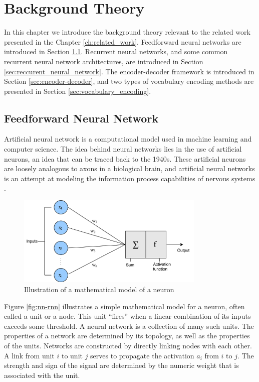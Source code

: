 
\chapter{Background Theory}
\label{ch:background}
In this chapter we introduce the background theory relevant to the related work presented in the Chapter \ref{ch:related_work}. Feedforward neural networks are introduced in Section \ref{sec:feedforward_neural_network}. Recurrent neural networks, and some common recurrent neural network architectures, are introduced in Section \ref{sec:reccurent_neural_network}. The encoder-decoder framework is introduced in Section \ref{sec:encoder-decoder}, and two types of vocabulary encoding methods are presented in Section \ref{sec:vocabulary_encoding}.


\section{Feedforward Neural Network}
\label{sec:feedforward_neural_network}
Artificial neural network is a computational model used in machine learning and computer science. The idea behind neural networks lies in the use of artificial neurons, an idea that can be traced back to the 1940s. These artificial neurons are loosely analogous to axons in a biological brain, and artificial neural networks is an attempt at modeling the information process capabilities of nervous systems \citep{russell2010aimodernapproach}.

\begin{figure}[h]
    \centering
    \includegraphics[width=0.8\textwidth]{fig/related_work/perceptron.png}
    \caption{Illustration of a mathematical model of a neuron}
    \label{fig:nn-perceptron}
\end{figure}

Figure \ref{fig:nn-rnn} illustrates a simple mathematical model for a neuron, often called a unit or a node. This unit ``fires'' when a linear combination of its inputs exceeds some threshold. A neural network is a collection of many such units. The properties of a network are determined by its topology, as well as the properties of the units. Networks are constructed by directly linking nodes with each other. A link from unit \(i\) to unit \(j\) serves to propagate the activation \(a_{i}\) from \(i\) to \(j\). The strength and sign of the signal are determined by the numeric weight that is associated with the unit. 

